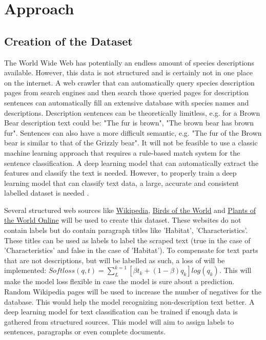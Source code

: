 \documentclass{article}
\begin{document}
\section{Approach} 
\subsection{Creation of the Dataset}
The World Wide Web has potentially an endless amount of species descriptions available.
However, this data is not structured and is certainly not in one place on the internet.
A web crawler that can automatically query species description pages from search engines and then search those queried pages for description sentences can automatically fill an extensive database with species names and descriptions. 
Description sentences can be theoretically limitless, e.g. for a Brown Bear description text could be: "The fur is brown", "The brown bear has brown fur".
Sentences can also have a more difficult semantic, e.g. "The fur of the Brown bear is similar to that of the Grizzly bear".
It will not be feasible to use a classic machine learning approach that requires a rule-based match system for the sentence classification. 
A deep learning model that can automatically extract the features and classify the text is needed.
However, to properly train a deep learning model that can classify text data, a large, accurate and consistent labelled dataset is needed \autocite{munappy_data_2019}.

Several structured web sources like \href{http://www.Wikipedia.com}{Wikipedia}, \href{https://birdsoftheworld.org}{Birds of the World} and \href{http://powo.science.kew.org/}{Plants of the World Online} will be used to create this dataset.
These websites do not contain labels but do contain paragraph titles like 'Habitat', 'Characteristics'. 
These titles can be used as labels to label the scraped text (true in the case of 'Characteristics' and false in the case of 'Habitat').
To compensate for text parts that are not  descriptions, but will be labelled as such, a loss of \textcite{reed_training_2015} will be implemented: \( Softloss(q, t) =  \sum_{L}^{k=1} [\beta t _k + (1- \beta )q _k]log(q _k) \).
This will make the model loss flexible in case the model is sure about a prediction.
Random Wikipedia pages will be used to increase the number of negatives for the database.
This would help the model recognizing non-description text better.
A deep learning model for text classification can be trained if enough data is gathered from structured sources.
This model will aim to assign labels to sentences, paragraphs or even complete documents. 
\end{document}
